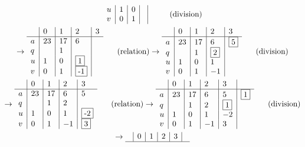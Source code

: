 \begin{propn}
\begin{multline*}
\begin{array}{l|l|l|l|l}
u & 1  & 0        &   &  \\
v & 0  & 1        &   & 
\end{array}
\hspace{0.5cm} \text{ (division)}\\
\rightarrow
\begin{array}{l|l|l|l|l}
  & 0  & 1  & 2         & 3  \\ \hline
a & 23 & 17 & 6         &  \\ 
q &    & 1  &           &  \\ 
u & 1  & 0  & \fbox{1}  &  \\
v & 0  & 1  & \fbox{-1} & 
\end{array}\hspace{0.5cm} \text{ (relation)}
\rightarrow
\begin{array}{l|l|l|l|l}
  & 0  & 1  & 2         & 3  \\ \hline
a & 23 & 17 & 6         & \fbox{5} \\ 
q &    & 1  & \fbox{2}  &  \\ 
u & 1  & 0  & 1         &  \\
v & 0  & 1  & -1        & 
\end{array}\hspace{0.5cm} \text{ (division)}\\
\rightarrow
\begin{array}{l|l|l|l|l}
  & 0  & 1  & 2  & 3  \\ \hline
a & 23 & 17 & 6  & 5   \\ 
q &    & 1  & 2  &            \\ 
u & 1  & 0  & 1  &  \fbox{-2} \\
v & 0  & 1  & -1 &  \fbox{3}
\end{array}\hspace{0.5cm} \text{ (relation)}
\rightarrow
\begin{array}{l|l|l|l|l|l}
  & 0  & 1  & 2  & 3       &          \\ \hline
a & 23 & 17 & 6  & 5       & \fbox{1} \\ 
q &    & 1  & 2  & \fbox{1}&          \\ 
u & 1  & 0  & 1  & -2      &          \\
v & 0  & 1  & -1 & 3       &
\end{array}\hspace{0.5cm} \text{ (division)} \\
\rightarrow
\begin{array}{l|l|l|l|l|l}
  & 0  & 1  & 2  & 3  &          \\ \hline

\end{array}
\end{multline*}
\end{propn}
